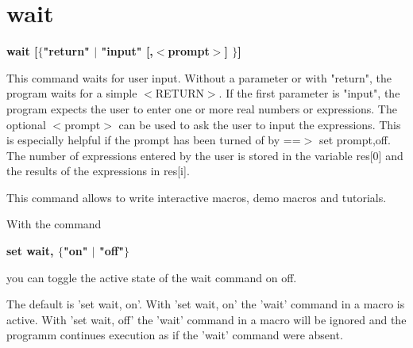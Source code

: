 \section{wait}
{\bf wait [$ \{$"return" $| $ "input" [,$ <$prompt$> $] $\} $] \par }
\par
\vspace{3pt}
This command waits for user input. 
Without a parameter or with "return", the program waits for a 
simple $ <$RETURN$> $. 
If the first parameter is "input", the program expects the user to enter 
one or more real numbers or expressions. The optional $ <$prompt$> $ can be 
used to ask the user to input the expressions. This is especially 
helpful if the prompt has been turned of by ==$> $ set prompt,off. 
The number of expressions entered by the user is stored in the variable 
res[0] and the results of the expressions in res[i]. 
\par
This command allows to write interactive macros, demo macros 
and tutorials. 
\par
With the command 
{\bf set wait, $ \{$"on" $| $ "off"$\} $ \par }
\vspace{3pt}
you can toggle the active state of the wait command on off. 
\par
The default is 'set wait, on'. 
With 'set wait, on' the 'wait' command in a macro is active. 
With 'set wait, off' the 'wait' command in a macro will be 
ignored and the programm continues execution as if the 
'wait' command were absent. 
